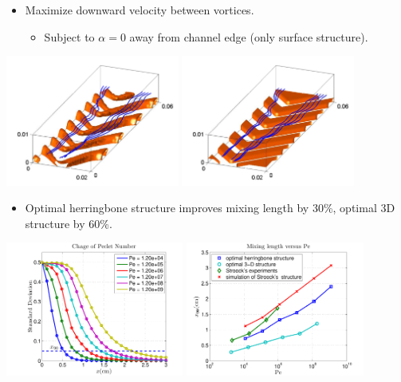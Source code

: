 \documentclass[12pt,t]{beamer}
\begin{document}
\begin{frame}
  \begin{itemize}
  \item Maximize downward velocity between vortices.
    \begin{itemize}
    \item Subject to $\alpha = 0$ away from channel edge (only surface
      structure).
    \end{itemize}
  \end{itemize}
  \begin{center}
    \includegraphics[height=4.3cm]{myharringbonestructure}
    \includegraphics[height=4.3cm]{stroockstructure}
  \end{center}
\end{frame}
\begin{frame}
  \begin{itemize}
  \item Optimal herringbone structure improves mixing length by 30\%,
    optimal 3D structure by 60\%.
  \end{itemize}
  \begin{center}
    \includegraphics[height=4.4cm]{example2veryPe2}
    \hfill
    \includegraphics[height=4.4cm]{example2mixinglength2}
  \end{center}
\end{frame}
\end{document}
